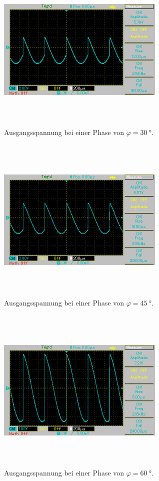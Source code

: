 \begin{figure}
    \centering
    \includegraphics[width=8cm, height=8cm]{build/3.jpg}
    \caption{Ausgangsspannung bei einer Phase von $\varphi = \SI{30}{\degree}$.}
    \label{fig:bild3}
\end{figure}

\begin{figure}
    \centering
    \includegraphics[width=8cm, height=8cm]{build/4.jpg}
    \caption{Ausgangsspannung bei einer Phase von $\varphi = \SI{45}{\degree}$.}
    \label{fig:bild4}
\end{figure}

\begin{figure}
    \centering
    \includegraphics[width=8cm, height=8cm]{build/5.jpg}
    \caption{Ausgangsspannung bei einer Phase von $\varphi = \SI{60}{\degree}$.}
    \label{fig:bild5}
\end{figure}

